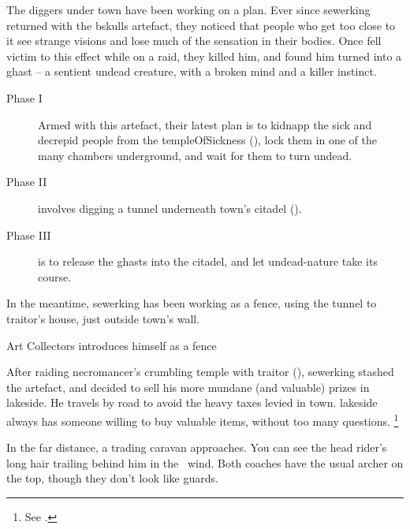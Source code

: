 \label{sewerking}

\noindent
\begin{exampletext}
  \noindent
  The \glspl{digger} under \gls{town} have been working on a plan.
  Ever since \gls{sewerking} returned with the \gls{bskulls} \gls{artefact}, they noticed that people who get too close to it see strange visions and lose much of the sensation in their bodies.
  Once  fell victim to this effect while on a raid, they killed him, and found him turned into a ghast -- a sentient undead creature, with a broken mind and a killer instinct.%

  \label{ghastPlan}
  \begin{description}
    \item[Phase I]
    Armed with this \gls{artefact}, their latest plan is to kidnapp the sick and decrepid people from the \gls{templeOfSickness} (), lock them in one of the many chambers underground, and wait for them to turn undead.
    \item[Phase II]
    involves digging a tunnel underneath \gls{town}'s citadel ().
    \item[Phase III]
    is to release the ghasts into the citadel, and let undead-nature take its course.
  \end{description}

  In the meantime, \gls{sewerking} has been working as a fence, using the tunnel to \gls{traitor}'s house, just outside \gls{town}'s wall.

\end{exampletext}

{Art Collectors}%
{ introduces himself as a fence}%

\begin{exampletext}
  After raiding \gls{necromancer}'s crumbling temple with \gls{traitor} (), \gls{sewerking} stashed the \gls{artefact}, and decided to sell his more mundane (and valuable) prizes in \gls{lakeside}.
  He travels by road to avoid the heavy taxes levied in \gls{town}.%
  \Gls{lakeside} always has someone willing to buy valuable items, without too many questions.%
  \footnote{See .}
\end{exampletext}

\begin{boxtext}
  In the far distance, a trading caravan approaches.
  You can see the head rider's long hair trailing behind him in the \showTemperature\ wind.
  Both coaches have the usual archer on the top, though they don't look like \glspl{guard}.
\end{boxtext}


